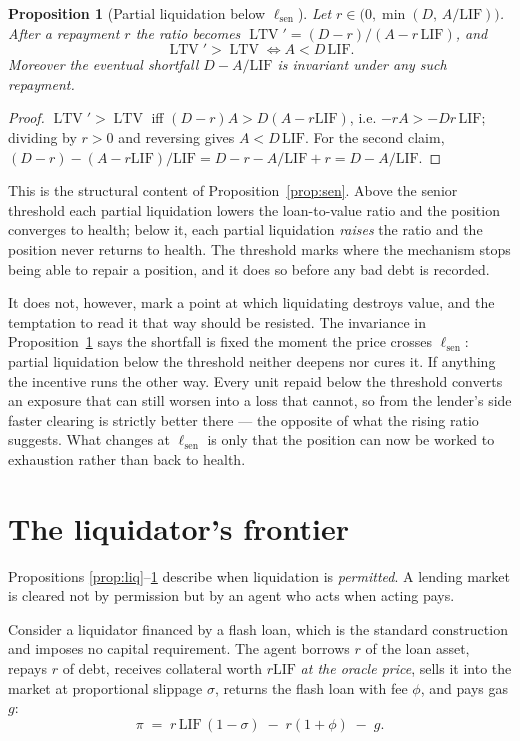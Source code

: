 \documentclass[11pt,a4paper]{article}
\theoremstyle{plain}
\newtheorem{proposition}{Proposition}
\theoremstyle{definition}
\theoremstyle{remark}
\newcommand{\LIF}{\mathrm{LIF}}
\DeclareMathOperator{\ltv}{LTV}
\begin{document}
\begin{proposition}[Partial liquidation below $\ell_{\mathrm{sen}}$]\label{prop:sign}
Let $r \in \bigl(0,\min(D,\,A/\LIF)\bigr)$. After a repayment $r$ the ratio becomes
$\ltv' = (D-r)/(A-r\,\LIF)$, and
\[
  \ltv' > \ltv \iff A < D\,\LIF .
\]
Moreover the eventual shortfall $D-A/\LIF$ is invariant under any such repayment.
\end{proposition}

\begin{proof}
$\ltv'>\ltv$ iff $(D-r)A > D(A-r\LIF)$, i.e. $-rA > -Dr\,\LIF$; dividing by $r>0$ and reversing
gives $A < D\,\LIF$. For the second claim,
$(D-r)-(A-r\LIF)/\LIF = D - r - A/\LIF + r = D-A/\LIF$.
\end{proof}

This is the structural content of Proposition~\ref{prop:sen}. Above the senior threshold each
partial liquidation lowers the loan-to-value ratio and the position converges to health; below
it, each partial liquidation \emph{raises} the ratio and the position never returns to health.
The threshold marks where the mechanism stops being able to repair a position, and it does so
before any bad debt is recorded.

It does not, however, mark a point at which liquidating destroys value, and the temptation to
read it that way should be resisted. The invariance in Proposition~\ref{prop:sign} says the
shortfall is fixed the moment the price crosses $\ell_{\mathrm{sen}}$: partial liquidation below
the threshold neither deepens nor cures it. If anything the incentive runs the other way. Every
unit repaid below the threshold converts an exposure that can still worsen into a loss that
cannot, so from the lender's side faster clearing is strictly better there --- the opposite of
what the rising ratio suggests. What changes at $\ell_{\mathrm{sen}}$ is only that the position
can now be worked to exhaustion rather than back to health.

\section{The liquidator's frontier}\label{sec:frontier}

Propositions \ref{prop:liq}--\ref{prop:sign} describe when liquidation is \emph{permitted}. A
lending market is cleared not by permission but by an agent who acts when acting pays.

Consider a liquidator financed by a flash loan, which is the standard construction and imposes no
capital requirement. The agent borrows $r$ of the loan asset, repays $r$ of debt, receives
collateral worth $r\LIF$ \emph{at the oracle price}, sells it into the market at proportional
slippage $\sigma$, returns the flash loan with fee $\phi$, and pays gas $g$:
\[
  \pi \;=\; r\,\LIF\,(1-\sigma) \;-\; r(1+\phi) \;-\; g .
\]
\end{document}
